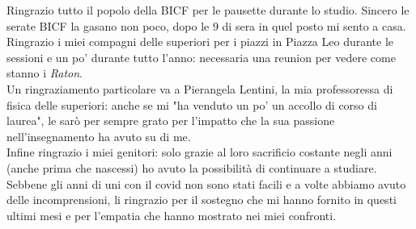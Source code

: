 \begin{acknowledgements}
Ringrazio tutto il popolo della BICF per le pausette durante lo studio. Sincero le serate BICF la gasano non poco, dopo le 9 di sera in quel posto mi sento a casa.\\

Ringrazio i miei compagni delle superiori per i piazzi in Piazza Leo durante le sessioni e un po' durante tutto l'anno: necessaria una reunion per vedere come stanno i \textit{Raton}.\\

Un ringraziamento particolare va a Pierangela Lentini, la mia professoressa di fisica delle superiori: anche se mi "ha venduto un po' un accollo di corso di laurea", le sarò per sempre grato per l'impatto che la sua passione nell'insegnamento ha avuto su di me.\\

Infine ringrazio i miei genitori: solo grazie al loro sacrificio costante negli anni (anche prima che nascessi) ho avuto la possibilità di continuare a studiare. 
Sebbene gli anni di uni con il covid non sono stati facili e a volte abbiamo avuto delle incomprensioni, li ringrazio per il sostegno che mi hanno fornito in questi ultimi mesi e per l'empatia che hanno mostrato nei miei confronti. \

\end{acknowledgements}
